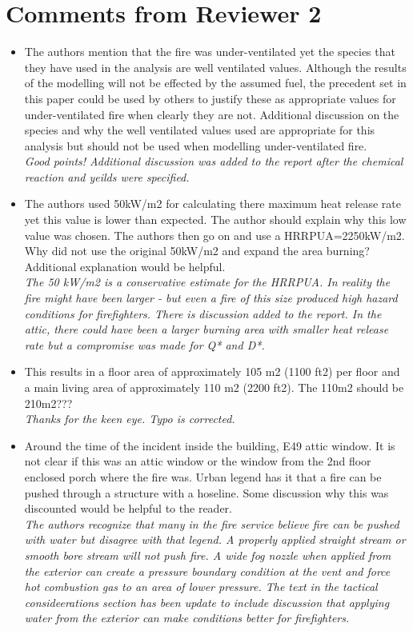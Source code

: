 \documentclass[12pt]{article}
\begin{document}
\section{Comments from Reviewer 2}
\begin{itemize}
 \item The authors mention that the fire was under-ventilated yet the species that they have used in the analysis are well ventilated values.  Although the results of the modelling will not be effected by the assumed fuel, the precedent set in this paper could be used by others to justify these as appropriate values for under-ventilated fire when clearly they are not.  Additional discussion on the species and why the well ventilated values used are appropriate for this analysis but should not be used when modelling under-ventilated fire. \\
{\it Good points! Additional discussion was added to the report after the chemical reaction and yeilds were specified.}
\item The authors used 50kW/m2 for calculating there maximum heat release rate yet this value is lower than expected.  The author should explain why this low value was chosen.  The authors then go on and use a HRRPUA=2250kW/m2.  Why did not use the original 50kW/m2 and expand the area burning?  Additional explanation would be helpful. \\
{\it The 50 kW/m2 is a conservative estimate for the HRRPUA. In reality the fire might have been larger - but even a fire of this size produced high hazard conditions for firefighters. There is discussion added to the report. In the attic, there could have been a larger burning area with smaller heat release rate but a compromise was made for Q* and D*.}
\item This results in a floor area of approximately 105 m2 (1100 ft2) per floor and a main living area of approximately 110 m2 (2200 ft2).
The 110m2 should be 210m2??? \\
{\it Thanks for the keen eye. Typo is corrected.}
\item  Around the time of the incident inside the building, E49 attic window.  It is not clear if this was an attic window or the window from the 2nd floor enclosed porch where the fire was.  Urban legend has it that a fire can be pushed through a structure with a hoseline.  Some discussion why this was discounted would be helpful to the reader. \\
{\it The authors recognize that many in the fire service believe fire can be pushed with water but disagree with that legend. A properly applied straight stream or smooth bore stream will not push fire. A wide fog nozzle when applied from the exterior can create a pressure boundary condition at the vent and force hot combustion gas to an area of lower pressure. The text in the tactical consideerations section has been update to include discussion that applying water from the exterior can make conditions better for firefighters.}

\end{itemize}
\end{document}
